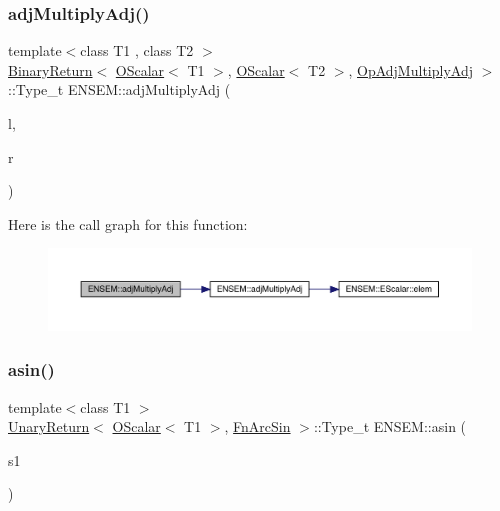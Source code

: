 \subsubsection{\texorpdfstring{adjMultiplyAdj()}{adjMultiplyAdj()}}
{\footnotesize\ttfamily template$<$class T1 , class T2 $>$ \\
\mbox{\hyperlink{structENSEM_1_1BinaryReturn}{Binary\+Return}}$<$ \mbox{\hyperlink{classENSEM_1_1OScalar}{O\+Scalar}}$<$ T1 $>$, \mbox{\hyperlink{classENSEM_1_1OScalar}{O\+Scalar}}$<$ T2 $>$, \mbox{\hyperlink{structENSEM_1_1OpAdjMultiplyAdj}{Op\+Adj\+Multiply\+Adj}} $>$\+::Type\+\_\+t E\+N\+S\+E\+M\+::adj\+Multiply\+Adj (\begin{DoxyParamCaption}\item[{const \mbox{\hyperlink{classENSEM_1_1OScalar}{O\+Scalar}}$<$ T1 $>$ \&}]{l,  }\item[{const \mbox{\hyperlink{classENSEM_1_1OScalar}{O\+Scalar}}$<$ T2 $>$ \&}]{r }\end{DoxyParamCaption})\hspace{0.3cm}{\ttfamily [inline]}}

Here is the call graph for this function\+:\nopagebreak
\begin{figure}[H]
\begin{center}
\leavevmode
\includegraphics[width=350pt]{d1/d71/group__obsscalar_ga53406445c0fa210f9ed3a41ab077b31e_cgraph}
\end{center}
\end{figure}
\mbox{\label{group__obsscalar_gac74c6933e6f290335c2ec508825d5fbb}} 
\subsubsection{\texorpdfstring{asin()}{asin()}}
{\footnotesize\ttfamily template$<$class T1 $>$ \\
\mbox{\hyperlink{structENSEM_1_1UnaryReturn}{Unary\+Return}}$<$ \mbox{\hyperlink{classENSEM_1_1OScalar}{O\+Scalar}}$<$ T1 $>$, \mbox{\hyperlink{structENSEM_1_1FnArcSin}{Fn\+Arc\+Sin}} $>$\+::Type\+\_\+t E\+N\+S\+E\+M\+::asin (\begin{DoxyParamCaption}\item[{const \mbox{\hyperlink{classENSEM_1_1OScalar}{O\+Scalar}}$<$ T1 $>$ \&}]{s1 }\end{DoxyParamCaption})\hspace{0.3cm}{\ttfamily [inline]}}

